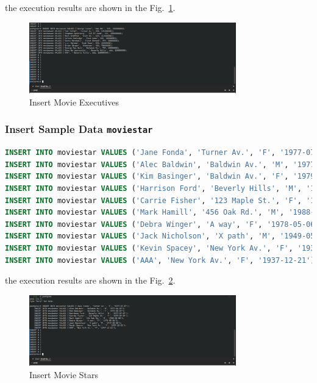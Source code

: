 \documentclass{cshwk}
\begin{document}
the execution results are shown in the Fig.~\ref{fig:insert-movieexec}.
\begin{figure}[H]
    \centering
    \includegraphics[width=0.8\textwidth]{hw5-3.png}
    \caption{Insert Movie Executives}
    \label{fig:insert-movieexec}
\end{figure}

\subsubsection{Insert Sample Data \texttt{moviestar}}

\begin{lstlisting}[language=sql]
INSERT INTO moviestar VALUES ('Jane Fonda', 'Turner Av.', 'F', '1977-07-07');
INSERT INTO moviestar VALUES ('Alec Baldwin', 'Baldwin Av.', 'M', '1977-06-07');
INSERT INTO moviestar VALUES ('Kim Basinger', 'Baldwin Av.', 'F', '1979-05-07');
INSERT INTO moviestar VALUES ('Harrison Ford', 'Beverly Hills', 'M', '1977-07-07');
INSERT INTO moviestar VALUES ('Carrie Fisher', '123 Maple St.', 'F', '1999-09-09');
INSERT INTO moviestar VALUES ('Mark Hamill', '456 Oak Rd.', 'M', '1988-08-08');
INSERT INTO moviestar VALUES ('Debra Winger', 'A way', 'F', '1978-05-06');
INSERT INTO moviestar VALUES ('Jack Nicholson', 'X path', 'M', '1949-05-05');
INSERT INTO moviestar VALUES ('Kevin Spacey', 'New York Av.', 'F', '1937-12-21');
INSERT INTO moviestar VALUES ('AAA', 'New York Av.', 'F', '1937-12-21');
\end{lstlisting}

the execution results are shown in the Fig.~\ref{fig:insert-moviestar}.
\begin{figure}[H]
    \centering
    \includegraphics[width=0.8\textwidth]{hw5-4.png}
    \caption{Insert Movie Stars}
    \label{fig:insert-moviestar}
\end{figure}
\end{document}
